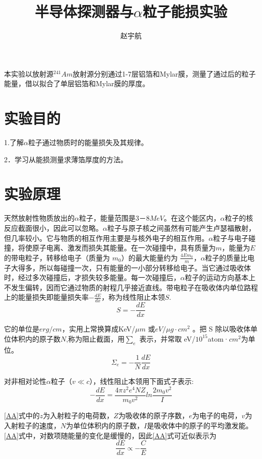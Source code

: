 \documentclass[hyperref]{ctexart}
\title{\textbf{半导体探测器与$\alpha$粒子能损实验}}
\author{\sffamily 赵宇航}
\date{}
\begin{document}
\maketitle
{}本实验以放射源$^{241}Am$放射源分别通过1-7层铝箔和Mylar膜，测量了通过后的粒子能量，借以拟合了单层铝箔和Mylar膜的厚度。\\	
\begin{multicols}{2}
	\section{实验目的}
	1.了解$\alpha$粒子通过物质时的能量损失及其规律。

	2．学习从能损测量求薄箔厚度的方法。
	\section{实验原理}
	天然放射性物质放出的$\alpha$粒子，能量范围是$3－8MeV$。在这个能区内，$\alpha$粒子的核反应截面很小，因此可以忽略。$\alpha$粒子与原子核之间虽然有可能产生卢瑟福散射，但几率较小。它与物质的相互作用主要是与核外电子的相互作用。$\alpha$粒子与电子碰撞，将使原子电离、激发而损失其能量。在一次碰撞中，具有质量为$m$，能量为$E$的带电粒子，转移给电子（质量为 $m_0$）的最大能量约为 $\frac{4Em_0}{m}$，$\alpha$粒子的质量比电子大得多，所以每碰撞一次，只有能量的一小部分转移给电子。当它通过吸收体时，经过多次碰撞后，才损失较多能量。每一次碰撞后，$\alpha$粒子的运动方向基本上不发生偏转，因而它通过物质的射程几乎接近直线。带电粒子在吸收体内单位路程上的能量损失即能量损失率$-\frac{dE}{dx}$，称为线性阻止本领$S$.
	\begin{equation}
	S=-\frac{dE}{dx}
	\end{equation}

	它的单位是$erg/cm$，实用上常换算成KeV/$\mu m$ 或$eV/μg ·{cm}^2$ 。把 S 除以吸收体单位体积内的原子数$N$,称为阻止截面，用$\sum_e$ 表示，并常取 eV/${10}^{15}$atom·${cm}^2$为单位。
	\begin{equation}
	\Sigma_e=-\frac1 N \frac{dE}{dx}\label{11}
	\end{equation}
	
	对非相对论性$\alpha$粒子（$v\ll c$），线性阻止本领用下面式子表示:
	\begin{equation}\label{AA}
	-\frac{dE}{dx}=\frac{4\pi z^2e^4NZ}{m_0v^2}ln\frac{2m_0v^2}{I}
	\end{equation}

	\eqref{AA}式中的$z$为入射粒子的电荷数，$Z$为吸收体的原子序数，$e$为电子的电荷，$v$为入射粒子的速度，$N$为单位体积内的原子数，$I$是吸收体中的原子的平均激发能。\eqref{AA}式中，对数项随能量的变化是缓慢的，因此\eqref{AA}式可近似表示为
	\begin{equation}
	\frac{dE}{dx}\propto -\frac{C}{E}
	\end{equation}


\end{multicols}
\end{document}
